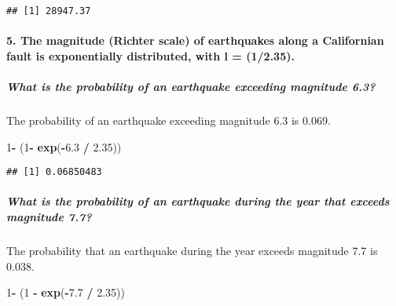 \documentclass[
]{article}
\newenvironment{Shaded}{\begin{snugshade}}{\end{snugshade}}
\newcommand{\DecValTok}[1]{\textcolor[rgb]{0.00,0.00,0.81}{#1}}
\newcommand{\FloatTok}[1]{\textcolor[rgb]{0.00,0.00,0.81}{#1}}
\newcommand{\FunctionTok}[1]{\textcolor[rgb]{0.13,0.29,0.53}{\textbf{#1}}}
\newcommand{\NormalTok}[1]{#1}
\newcommand{\SpecialCharTok}[1]{\textcolor[rgb]{0.81,0.36,0.00}{\textbf{#1}}}
\begin{document}
\begin{verbatim}
## [1] 28947.37
\end{verbatim}

\hypertarget{the-magnitude-richter-scale-of-earthquakes-along-a-californian-fault-is-exponentially-distributed-with-l-12.35.}{%
\paragraph{5. The magnitude (Richter scale) of earthquakes along a
Californian fault is exponentially distributed, with l =
(1/2.35).}\label{the-magnitude-richter-scale-of-earthquakes-along-a-californian-fault-is-exponentially-distributed-with-l-12.35.}}

\hypertarget{what-is-the-probability-of-an-earthquake-exceeding-magnitude-6.3}{%
\subparagraph{What is the probability of an earthquake exceeding
magnitude
6.3?}\label{what-is-the-probability-of-an-earthquake-exceeding-magnitude-6.3}}

The probability of an earthquake exceeding magnitude 6.3 is 0.069.

\begin{Shaded}
\begin{Highlighting}[]
\DecValTok{1}\SpecialCharTok{{-}}\NormalTok{ (}\DecValTok{1}\SpecialCharTok{{-}} \FunctionTok{exp}\NormalTok{(}\SpecialCharTok{{-}}\FloatTok{6.3} \SpecialCharTok{/} \FloatTok{2.35}\NormalTok{))}
\end{Highlighting}
\end{Shaded}

\begin{verbatim}
## [1] 0.06850483
\end{verbatim}

\hypertarget{what-is-the-probability-of-an-earthquake-during-the-year-that-exceeds-magnitude-7.7}{%
\subparagraph{What is the probability of an earthquake during the year
that exceeds magnitude
7.7?}\label{what-is-the-probability-of-an-earthquake-during-the-year-that-exceeds-magnitude-7.7}}

The probability that an earthquake during the year exceeds magnitude 7.7
is 0.038.

\begin{Shaded}
\begin{Highlighting}[]
\DecValTok{1}\SpecialCharTok{{-}}\NormalTok{ (}\DecValTok{1} \SpecialCharTok{{-}} \FunctionTok{exp}\NormalTok{(}\SpecialCharTok{{-}}\FloatTok{7.7} \SpecialCharTok{/} \FloatTok{2.35}\NormalTok{))}
\end{Highlighting}
\end{Shaded}
\end{document}

